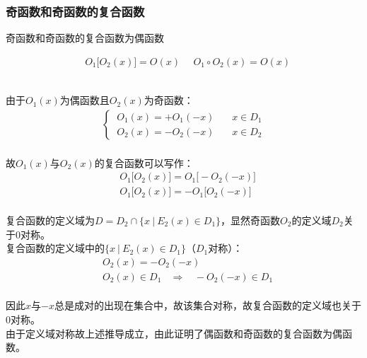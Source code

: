 \documentclass[UTF8]{ctexart}
\begin{document}
\newpage

\subsubsection{奇函数和奇函数的复合函数}
    \setcounter{equation}{0}
    奇函数和奇函数的复合函数为偶函数
    \begin{large}
        \begin{align*}
            &O_1\big[O_2(x)\big]=O(x)~~~~~~O_1\circ O_2(x)=O(x)
        \end{align*}
    \end{large}\\
    由于$O_1(x)$为偶函数且$O_2(x)$为奇函数：
    \begin{align}
        \begin{cases}
            ~O_1(x)=+O_1(-x)~~~~~~~~x\in D_1\\[1mm]
            ~O_2(x)=-O_2(-x)~~~~~~~~x\in D_2
        \end{cases}
    \end{align}\\
    故$O_1(x)$与$O_2(x)$的复合函数可以写作：
    \begin{align}
        &O_1\big[O_2(x)\big]=O_1\big[-O_2(-x)\big]\\[3mm]
        &O_1\big[O_2(x)\big]=-O_1\big[O_2(-x)\big]
    \end{align}\\
    复合函数的定义域为$D=D_2\cap\big\{x~|~E_2(x)\in D_1\big\}$，显然奇函数$O_2$的定义域$D_2$关于$0$对称。\\[3mm]
    复合函数的定义域中的$\big\{x~|~E_2(x)\in D_1\big\}$（$D_1$对称）：\vspace{5pt}
    \begin{align}
        &O_2(x)=-O_2(-x)\\[3mm]
        &O_2(x)\in D_1~~~~\Longrightarrow~~~~-O_2(-x)\in D_1
    \end{align}\\
    因此$x$与$-x$总是成对的出现在集合中，故该集合对称，故复合函数的定义域也关于$0$对称。\\[3mm]
    由于定义域对称故上述推导成立，由此证明了偶函数和奇函数的复合函数为偶函数。\vspace{8pt}

\newpage
\end{document}
